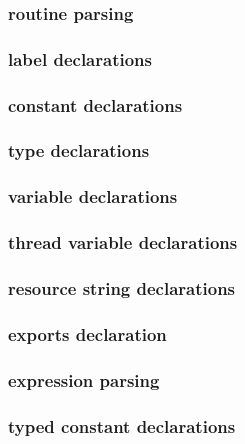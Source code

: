 \documentclass [a4paper,12pt]{article}
\begin{document}
\subsubsection{routine parsing }
\label{subsubsec:routine}

\subsubsection{label declarations }
\label{subsubsec:mylabel13}

\subsubsection{constant declarations}
\label{subsubsec:mylabel14}

\subsubsection{type declarations}
\label{subsubsec:mylabel15}

\subsubsection{variable declarations}
\label{subsubsec:mylabel16}

\subsubsection{thread variable declarations}
\label{subsubsec:thread}

\subsubsection{resource string declarations}
\label{subsubsec:resource}

\subsubsection{exports declaration}
\label{subsubsec:exports}

\subsubsection{expression parsing }
\label{subsubsec:expression}

\subsubsection{typed constant declarations}
\label{subsubsec:mylabel17}
\end{document}

